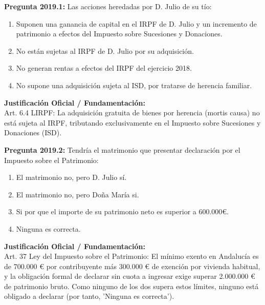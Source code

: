 \documentclass[11pt,a4paper,openany]{article}
\begin{document}
\noindent\textbf{\sffamily Pregunta 2019.1:} Las acciones heredadas por D. Julio de su tío:\\[0.15cm]
\begin{enumerate}[label=\textbf{\alph*)},leftmargin=1.8em,itemsep=1.5pt,topsep=2pt,partopsep=0pt,parsep=0pt]
    \item Suponen una ganancia de capital en el IRPF de D. Julio y un incremento de patrimonio a efectos del Impuesto sobre Sucesiones y Donaciones.
    \item No están sujetas al IRPF de D. Julio por su adquisición.
    \item No generan rentas a efectos del IRPF del ejercicio 2018.
    \item No supone una adquisición sujeta al ISD, por tratarse de herencia familiar.
\end{enumerate}
\begin{solucionBox}
\textbf{Justificación Oficial / Fundamentación:}\\[0.1cm]
Art. 6.4 LIRPF: La adquisición gratuita de bienes por herencia (mortis causa) no está sujeta al IRPF, tributando exclusivamente en el Impuesto sobre Sucesiones y Donaciones (ISD).
\end{solucionBox}
\vspace{0.35cm}

\noindent\textbf{\sffamily Pregunta 2019.2:} Tendría el matrimonio que presentar declaración por el Impuesto sobre el Patrimonio:\\[0.15cm]
\begin{enumerate}[label=\textbf{\alph*)},leftmargin=1.8em,itemsep=1.5pt,topsep=2pt,partopsep=0pt,parsep=0pt]
    \item El matrimonio no, pero D. Julio sí.
    \item El matrimonio no, pero Doña María si.
    \item Si por que el importe de su patrimonio neto es superior a 600.000\euro{}.
    \item Ninguna es correcta.
\end{enumerate}
\begin{solucionBox}
\textbf{Justificación Oficial / Fundamentación:}\\[0.1cm]
Art. 37 Ley del Impuesto sobre el Patrimonio: El mínimo exento en Andalucía es de 700.000 \euro{} por contribuyente más 300.000 \euro{} de exención por vivienda habitual, y la obligación formal de declarar sin cuota a ingresar exige superar 2.000.000 \euro{} de patrimonio bruto. Como ninguno de los dos supera estos límites, ninguno está obligado a declarar (por tanto, 'Ninguna es correcta').
\end{solucionBox}
\vspace{0.35cm}
\end{document}
